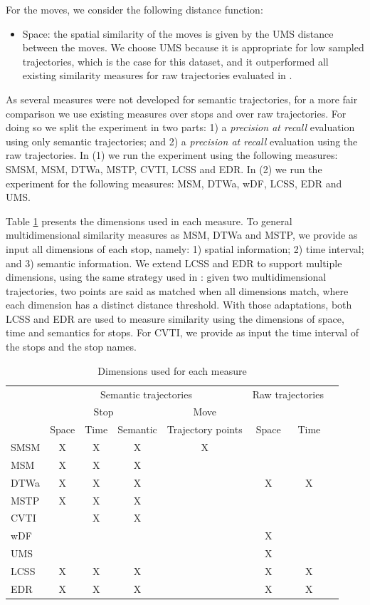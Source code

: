 \documentclass[12pt]{article}
\begin{document}
For the moves, we consider the following distance function:
\begin{itemize}
  \item Space: the spatial similarity of the moves is given by the UMS distance between the moves. We choose UMS because it is appropriate for low sampled trajectories, which is the case for this dataset, and it outperformed all existing similarity measures for raw trajectories evaluated in \cite{Furtado-UMS-2018}.
\end{itemize}

As several measures were not developed for semantic trajectories, for a more fair comparison we use existing measures over stops and over raw trajectories. For doing so we split the experiment in two parts: 1) a \textit{precision at recall} evaluation using only semantic trajectories; and 2) a \textit{precision at recall} evaluation using the raw trajectories. In (1) we run the experiment using the following measures: SMSM, MSM, DTWa, MSTP, CVTI, LCSS and EDR. In (2) we run the experiment for the following measures: MSM, DTWa, wDF, LCSS, EDR and UMS.

Table {\ref{tab:san_francisco_measures}} presents the dimensions used in each measure. To general multidimensional similarity measures as MSM, DTWa and MSTP, we provide as input all dimensions of each stop, namely: 1)  spatial information; 2) time interval; and 3) semantic information. We extend LCSS and EDR to support multiple dimensions, using the same strategy used in {\cite{Furtado:TGIS12156}}: given two multidimensional trajectories, two points are said as matched when all dimensions match, where each dimension has a distinct distance threshold. With those adaptations, both LCSS and EDR are used to measure similarity using the dimensions of space, time and semantics for stops. For CVTI, we provide as input the time interval of the stops and the stop names.

\begin{table}[!h]
\scriptsize
  \centering
  \begin{tabular}{|l|c|c|c|c|c|c|c|}
  	\hline
  & \multicolumn{4}{c|}{Semantic trajectories} & \multicolumn{2}{c|}{Raw trajectories} \\
 	\cline{2-5}
  & \multicolumn{3}{c|}{Stop} & \multicolumn{1}{c|}{Move} & \multicolumn{2}{c|}{} \\
 	\cline{2-7}
  & Space & Time & Semantic & Trajectory points & Space & Time\\
  	\hline
 SMSM & X & X & X & X & & \\
 MSM & X & X & X & & & \\
 DTWa & X & X & X & & X & X \\
 MSTP & X & X & X & & & \\
 CVTI & & X & X & & & \\
 wDF & & & & & X & \\
 UMS & & & & & X & \\
 LCSS & X & X & X & & X & X \\
 EDR & X & X & X & & X & X \\
    \hline
  \end{tabular}
  \caption{Dimensions used for each measure}
  \label{tab:san_francisco_measures}
\end{table}
\end{document}

